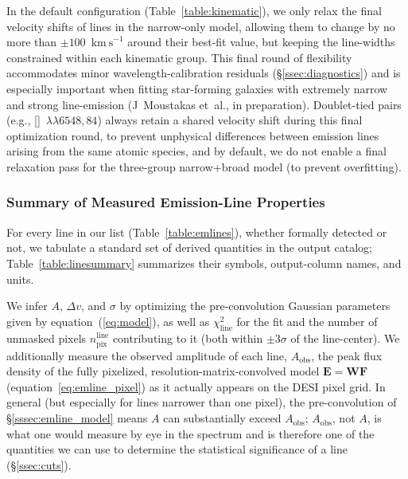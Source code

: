 \documentclass[modern,linenumbers]{aastex702}
\newcommand{\kms}{\ensuremath{\mathrm{km~s}^{-1}}}
\newcommand{\niidoublet}{[\ion{N}{2}]~$\lambda\lambda6548,84$}
\begin{document}
In the default configuration (Table~\ref{table:kinematic}), we only
relax the final velocity shifts of lines in the narrow-only model,
allowing them to change by no more than $\pm100$~\kms{} around their
best-fit value, but keeping the line-widths constrained within each
kinematic group. This final round of flexibility accommodates minor
wavelength-calibration residuals (\S\ref{ssec:diagnostics}) and is
especially important when fitting star-forming galaxies with extremely
narrow and strong line-emission (J~Moustakas et~al., in
preparation). Doublet-tied pairs (e.g., \niidoublet) always retain a
shared velocity shift during this final optimization round, to prevent
unphysical differences between emission lines arising from the same
atomic species, and by default, we do not enable a final relaxation
pass for the three-group narrow+broad model (to prevent overfitting).

\subsubsection{Summary of Measured Emission-Line Properties}
\label{sssec:lines}

For every line in our list (Table~\ref{table:emlines}), whether
formally detected or not, we tabulate a standard set of derived
quantities in the output catalog; Table~\ref{table:linesummary}
summarizes their symbols, output-column names, and units.

We infer $A$, $\Delta v$, and $\sigma$ by optimizing the
pre-convolution Gaussian parameters given by
equation~(\ref{eq:model}), as well as $\chi^2_\mathrm{line}$ for the
fit and the number of unmasked pixels $n_\mathrm{pix}^\mathrm{line}$
contributing to it (both within $\pm3\sigma$ of the line-center). We
additionally measure the observed amplitude of each line,
$A_\mathrm{obs}$, the peak flux density of the fully pixelized,
resolution-matrix-convolved model $\mathbf{E}=\mathbf{W}\mathbf{F}$
(equation~\ref{eq:emline_pixel}) as it actually appears on the DESI
pixel grid. In general (but especially for lines narrower than one
pixel), the pre-convolution of
\S\ref{sssec:emline_model} means $A$ can substantially exceed
$A_\mathrm{obs}$; $A_\mathrm{obs}$, not $A$, is what one would measure
by eye in the spectrum and is therefore one of the quantities we can
use to determine the statistical significance of a line
(\S\ref{ssec:cuts}).


\end{document}
